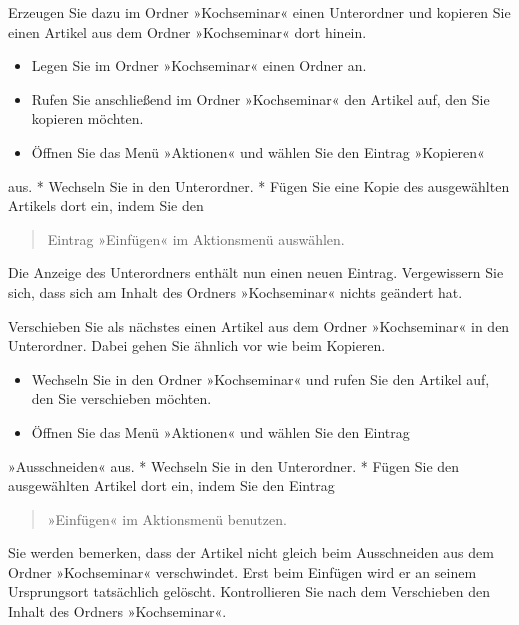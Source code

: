 \documentclass[a4paper,12pt,ngerman]{manual}
\begin{document}
Erzeugen Sie dazu im Ordner »Kochseminar« einen Unterordner und kopieren Sie
einen Artikel aus dem Ordner »Kochseminar« dort hinein.
\begin{itemize}
\item {} 
Legen Sie im Ordner »Kochseminar« einen Ordner an.

\item {} 
Rufen Sie anschließend im Ordner »Kochseminar« den Artikel auf, den Sie
kopieren möchten.

\item {} 
Öffnen Sie das Menü »Aktionen« und wählen Sie den Eintrag »Kopieren«

\end{itemize}

aus.
* Wechseln Sie in den Unterordner.
* Fügen Sie eine Kopie des ausgewählten Artikels dort ein, indem Sie den
\begin{quote}

Eintrag »Einfügen« im Aktionsmenü auswählen.
\end{quote}

Die Anzeige des Unterordners enthält nun einen neuen Eintrag. Vergewissern
Sie sich, dass sich am Inhalt des Ordners »Kochseminar« nichts geändert hat.

Verschieben Sie als nächstes einen Artikel aus dem Ordner »Kochseminar« in den
Unterordner. Dabei gehen Sie ähnlich vor wie beim Kopieren.
\begin{itemize}
\item {} 
Wechseln Sie in den Ordner »Kochseminar« und rufen Sie den Artikel auf,
den Sie verschieben möchten.

\item {} 
Öffnen Sie das Menü »Aktionen« und wählen Sie den Eintrag

\end{itemize}

»Ausschneiden« aus.
* Wechseln Sie in den Unterordner.
* Fügen Sie den ausgewählten Artikel dort ein, indem Sie den Eintrag
\begin{quote}

»Einfügen« im Aktionsmenü benutzen.
\end{quote}

Sie werden bemerken, dass der Artikel nicht gleich beim Ausschneiden aus dem
Ordner »Kochseminar« verschwindet. Erst beim Einfügen wird er an seinem
Ursprungsort tatsächlich gelöscht. Kontrollieren Sie nach dem Verschieben den
Inhalt des Ordners »Kochseminar«.
\end{document}
